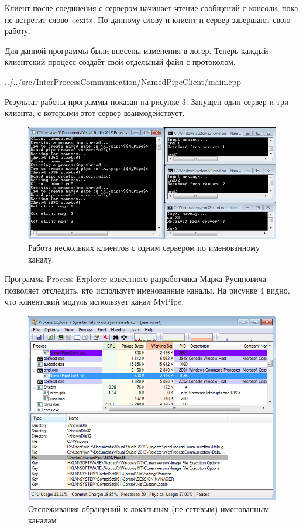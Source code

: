 \documentclass[a4paper, 12pt]{report}		%
\begin{document}
Клиент после соединения с сервером начинает чтение сообщений с консоли, пока не
встретит слово «exit». По данному слову и клиент и сервер завершают свою работу.

Для данной программы были внесены изменения в логер. Теперь каждый клиентский процесс создаёт свой отдельный файл с протоколом.


{../../src/InterProcessCommunication/NamedPipeClient/main.cpp}
\vspace{3em}

Результат работы программы показан на рисунке 3. Запущен один сервер и три клиента, с которыми этот сервер взаимодействует.

\begin{figure}[h!]
\centering
\includegraphics[scale=0.85]{res/03_named_pipes}
\caption{Работа нескольких клиентов с одним сервером по именованному каналу.}
\end{figure}

Программа Process Explorer известного разработчика Марка Русиновича позволяет отследить, кто использует именованные каналы. На рисунке 4 видно, что клиентский модуль использует канал MyPipe.
\vspace{2em}

\begin{figure}[h!]
\centering
\includegraphics[scale=0.8]{res/04_Process_Explorer_np}
\caption{Отслеживания обращений к локальным (не сетевым) именованным каналам}
\end{figure}
\end{document}
